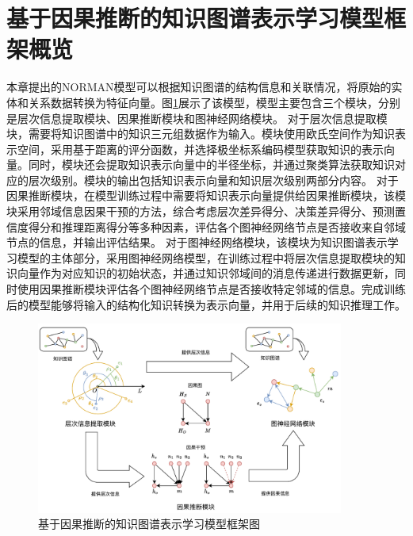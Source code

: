 \documentclass[algorithmlist, AutoFakeBold, AutoFakeSlant, figurelist, tablelist, nomlist, engineering]{seuthesix}
\begin{document}
\section{基于因果推断的知识图谱表示学习模型框架概览}
本章提出的NORMAN模型可以根据知识图谱的结构信息和关联情况，将原始的实体和关系数据转换为特征向量。图\ref{2_NORMAN}展示了该模型，模型主要包含三个模块，分别是层次信息提取模块、因果推断模块和图神经网络模块。
对于层次信息提取模块，需要将知识图谱中的知识三元组数据作为输入。模块使用欧氏空间作为知识表示空间，采用基于距离的评分函数，并选择极坐标系编码模型获取知识的表示向量。同时，模块还会提取知识表示向量中的半径坐标，并通过聚类算法获取知识对应的层次级别。模块的输出包括知识表示向量和知识层次级别两部分内容。
对于因果推断模块，在模型训练过程中需要将知识表示向量提供给因果推断模块，该模块采用邻域信息因果干预的方法，综合考虑层次差异得分、决策差异得分、预测置信度得分和推理距离得分等多种因素，评估各个图神经网络节点是否接收来自邻域节点的信息，并输出评估结果。
对于图神经网络模块，该模块为知识图谱表示学习模型的主体部分，采用图神经网络模型，在训练过程中将层次信息提取模块的知识向量作为对应知识的初始状态，并通过知识邻域间的消息传递进行数据更新，同时使用因果推断模块评估各个图神经网络节点是否接收特定邻域的信息。完成训练后的模型能够将输入的结构化知识转换为表示向量，并用于后续的知识推理工作。
\begin{figure}
  \centering
  \includegraphics[width=0.9\textwidth]{2_NORMAN}
  \caption{基于因果推断的知识图谱表示学习模型框架图}
  \label{2_NORMAN}
\end{figure}
\end{document}
